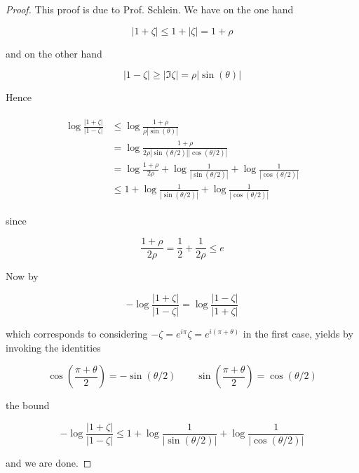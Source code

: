 \begin{proof}
	This proof is due to Prof. Schlein. We have on the one hand

	\begin{equation*}
		\left| 1 + \zeta \right| \leq 1 + \left| \zeta \right| = 1 + \rho
	\end{equation*}

	and on the other hand

	\begin{equation*}
		\left| 1 - \zeta \right| \geq \left|\Im\zeta \right| = \rho\left|\sin(\theta)\right|
	\end{equation*}

	Hence
	
	\begin{gather*}
		\begin{aligned}
			\log \frac{\left| 1 + \zeta \right|}{\left| 1 - \zeta \right|} &\leq \log\frac{1 + \rho}{\rho \left| \sin(\theta)\right|}\\
			&=  \log\frac{1 + \rho}{2\rho \left| \sin(\theta/2)\right|\left| \cos(\theta/2)\right|}\\
			&=  \log\frac{1 + \rho}{2\rho}  +  \log \frac{1}{\left| \sin(\theta/2)\right|} +  \log\frac{1}{\left| \cos(\theta/2)\right|}\\
			&\leq  1 + \log \frac{1}{\left| \sin(\theta/2)\right|} + \log \frac{1}{\left| \cos(\theta/2)\right|}	
		\end{aligned}
	\end{gather*}

	since

	\begin{equation*}
		\frac{1 + \rho}{2\rho} = \frac{1}{2} + \frac{1}{2\rho} \leq e
	\end{equation*}

	Now by

	\begin{equation*}
		-\log \frac{\left| 1 + \zeta \right|}{\left| 1 - \zeta \right|}  = 	\log \frac{\left| 1 - \zeta \right|}{\left| 1 + \zeta \right|} 
	\end{equation*}

	which corresponds to considering $-\zeta = e^{i\pi}\zeta = e^{i(\pi + \theta)}$ in the first case, yields by invoking the identities

	\begin{equation*}
		\cos\left( \frac{\pi + \theta}{2}\right) = -\sin(\theta/2) \qquad \sin\left( \frac{\pi + \theta}{2} \right) = \cos(\theta/2)
	\end{equation*}

	the bound 

	\begin{equation*}
		-\log \frac{\left| 1 + \zeta \right|}{\left| 1 - \zeta \right|} \leq 1 + \log \frac{1}{\left| \sin(\theta/2)\right|} + \log \frac{1}{\left| \cos(\theta/2)\right|}	 
	\end{equation*}

	and we are done.
\end{proof}


